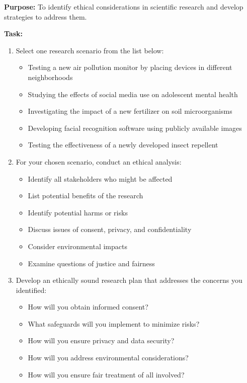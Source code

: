 \documentclass[justified,notoc]{tufte-book}
\newenvironment{investigation}[1]{%
    \begin{tcolorbox}[colback=info!10,colframe=info,title=\textbf{Investigation: #1}]
}{%
    \end{tcolorbox}
}
\begin{document}
\begin{investigation}{Ethical Research Design}
\textbf{Purpose:} To identify ethical considerations in scientific research and develop strategies to address them.

\textbf{Task:}
\begin{enumerate}
    \item Select one research scenario from the list below:
    \begin{itemize}
        \item Testing a new air pollution monitor by placing devices in different neighborhoods
        \item Studying the effects of social media use on adolescent mental health
        \item Investigating the impact of a new fertilizer on soil microorganisms
        \item Developing facial recognition software using publicly available images
        \item Testing the effectiveness of a newly developed insect repellent
    \end{itemize}
    
    \item For your chosen scenario, conduct an ethical analysis:
    \begin{itemize}
        \item Identify all stakeholders who might be affected
        \item List potential benefits of the research
        \item Identify potential harms or risks
        \item Discuss issues of consent, privacy, and confidentiality
        \item Consider environmental impacts
        \item Examine questions of justice and fairness
    \end{itemize}
    
    \item Develop an ethically sound research plan that addresses the concerns you identified:
    \begin{itemize}
        \item How will you obtain informed consent?
        \item What safeguards will you implement to minimize risks?
        \item How will you ensure privacy and data security?
        \item How will you address environmental considerations?
        \item How will you ensure fair treatment of all involved?
    \end{itemize}
    

\end{enumerate}
\end{investigation}
\end{document}
